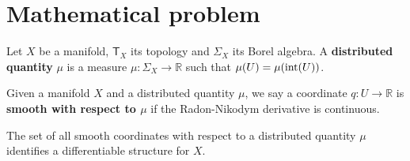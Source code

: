\documentclass[10pt, onecolumn, longbibliography, nofootinbib]{revtex4-2}
\begin{document}
\section{Mathematical problem}

\begin{defn}
	Let $X$ be a manifold, $\textsf{T}_X$ its topology and $\Sigma_X$ its Borel algebra. A \textbf{distributed quantity} $\mu$ is a measure $\mu : \Sigma_X \to \mathbb{R}$ such that $\mu(U) = \mu(\operatorname{int}(U))$. 
\end{defn}

\begin{defn}
	Given a manifold $X$ and a distributed quantity $\mu$, we say a coordinate $q : U \to \mathbb{R}$ is \textbf{smooth with respect to $\mu$} if the Radon-Nikodym derivative is continuous.
\end{defn}

\begin{desid}
	The set of all smooth coordinates with respect to a distributed quantity $\mu$ identifies a differentiable structure for $X$.
\end{desid}





\end{document}
